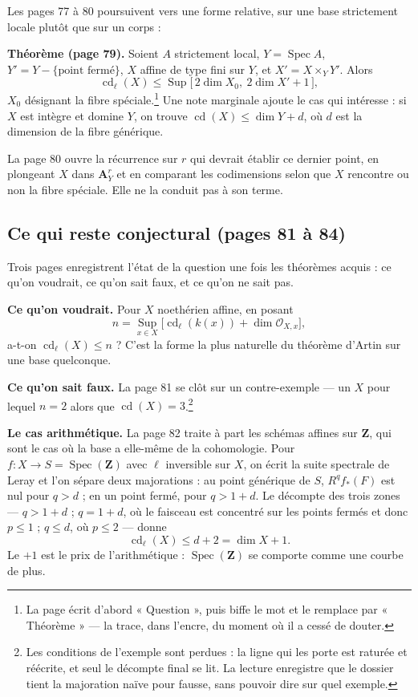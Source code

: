 \documentclass[11pt,a4paper]{article}
\begin{document}
Les pages 77 à 80 poursuivent vers une forme relative, sur une base strictement
locale plutôt que sur un corps :

\textbf{Théorème (page 79).} Soient $A$ strictement local, $Y =
\operatorname{Spec} A$, $Y' = Y - \{\text{point fermé}\}$, $X$ affine de type
fini sur $Y$, et $X' = X \times_Y Y'$. Alors
\[
\operatorname{cd}_{\ell}(X) \leqslant \operatorname{Sup}
\bigl[\,2\dim X_0,\ 2\dim X' + 1\,\bigr],
\]
$X_0$ désignant la fibre spéciale.\footnote{La page écrit d'abord
« Question », puis biffe le mot et le remplace par « Théorème » — la trace, dans
l'encre, du moment où il a cessé de douter.} Une note marginale ajoute le cas
qui intéresse : si $X$ est intègre et domine $Y$, on trouve
$\operatorname{cd}(X) \leqslant \dim Y + d$, où $d$ est la dimension de la fibre
générique.

La page 80 ouvre la récurrence sur $r$ qui devrait établir ce dernier point, en
plongeant $X$ dans $\mathbf{A}^r_Y$ et en comparant les codimensions selon que
$X$ rencontre ou non la fibre spéciale. Elle ne la conduit pas à son terme.

\subsection*{Ce qui reste conjectural (pages 81 à 84)}

Trois pages enregistrent l'état de la question une fois les théorèmes acquis :
ce qu'on voudrait, ce qu'on sait faux, et ce qu'on ne sait pas.

\textbf{Ce qu'on voudrait.} Pour $X$ noethérien affine, en posant
\[
n = \operatorname*{Sup}_{x \in X}\bigl[\operatorname{cd}_{\ell}(k(x))
+ \dim \mathcal{O}_{X,x}\bigr],
\]
a-t-on $\operatorname{cd}_{\ell}(X) \leqslant n$ ? C'est la forme la plus
naturelle du théorème d'Artin sur une base quelconque.

\textbf{Ce qu'on sait faux.} La page 81 se clôt sur un contre-exemple — un $X$
pour lequel $n = 2$ alors que $\operatorname{cd}(X) = 3$.\footnote{Les
conditions de l'exemple sont perdues : la ligne qui les porte est raturée et
réécrite, et seul le décompte final se lit. La lecture enregistre que le
dossier tient la majoration naïve pour fausse, sans pouvoir dire sur quel
exemple.}

\textbf{Le cas arithmétique.} La page 82 traite à part les schémas affines sur
$\mathbf{Z}$, qui sont le cas où la base a elle-même de la cohomologie. Pour
$f : X \to S = \operatorname{Spec}(\mathbf{Z})$ avec $\ell$ inversible sur $X$,
on écrit la suite spectrale de Leray et l'on sépare deux majorations : au point
générique de $S$, $R^q f_{*}(F)$ est nul pour $q > d$ ; en un point fermé, pour
$q > 1+d$. Le décompte des trois zones — $q > 1+d$ ; $q = 1+d$, où le faisceau
est concentré sur les points fermés et donc $p \leqslant 1$ ; $q \leqslant d$,
où $p \leqslant 2$ — donne
\[
\operatorname{cd}_{\ell}(X) \leqslant d + 2 = \dim X + 1 .
\]
Le $+1$ est le prix de l'arithmétique : $\operatorname{Spec}(\mathbf{Z})$ se
comporte comme une courbe de plus.
\end{document}
